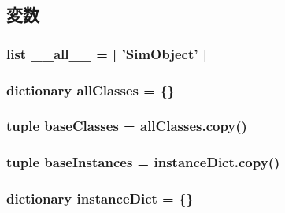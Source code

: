 \subsection{変数}
\hypertarget{namespacem5_1_1SimObject_aa4a022e6ddacd362b83964da5cc5d044}{
\subsubsection[{\_\-\_\-all\_\-\_\-}]{\setlength{\rightskip}{0pt plus 5cm}list {\bf \_\-\_\-all\_\-\_\-} = \mbox{[} '{\bf SimObject}' \mbox{]}}}
\label{namespacem5_1_1SimObject_aa4a022e6ddacd362b83964da5cc5d044}
\hypertarget{namespacem5_1_1SimObject_a47bdc1dd02e989cd5c98785b7e37af55}{
\subsubsection[{allClasses}]{\setlength{\rightskip}{0pt plus 5cm}dictionary {\bf allClasses} = \{\}}}
\label{namespacem5_1_1SimObject_a47bdc1dd02e989cd5c98785b7e37af55}
\hypertarget{namespacem5_1_1SimObject_aa25ce1667a6faf943271207f2cbfe0a9}{
\subsubsection[{baseClasses}]{\setlength{\rightskip}{0pt plus 5cm}tuple {\bf baseClasses} = allClasses.copy()}}
\label{namespacem5_1_1SimObject_aa25ce1667a6faf943271207f2cbfe0a9}
\hypertarget{namespacem5_1_1SimObject_a6c61232b42336e2874255341e828a11f}{
\subsubsection[{baseInstances}]{\setlength{\rightskip}{0pt plus 5cm}tuple {\bf baseInstances} = instanceDict.copy()}}
\label{namespacem5_1_1SimObject_a6c61232b42336e2874255341e828a11f}
\hypertarget{namespacem5_1_1SimObject_a05db33215202fbb08d002ba01ff26d78}{
\subsubsection[{instanceDict}]{\setlength{\rightskip}{0pt plus 5cm}dictionary {\bf instanceDict} = \{\}}}
